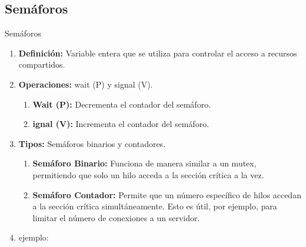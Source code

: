 \documentclass{beamer}
\begin{document}
\subsection{Semáforos}
\begin{frame}{Semáforos}

\begin{block}   
    \begin{enumerate}
        \item \textbf{Definición:} Variable entera que se utiliza para controlar el acceso a recursos compartidos. \pause
        \item \textbf{Operaciones:} wait (P) y signal (V).
        \begin{enumerate}
            \item \textbf{Wait (P):} Decrementa el contador del semáforo.
            \item \textbf{ignal (V):} Incrementa el contador del semáforo.
        \end{enumerate}\pause
        \item \textbf{Tipos:} Semáforos binarios y contadores.
        \begin{enumerate}
            \item \textbf{Semáforo Binario:} Funciona de manera similar a un mutex, permitiendo que solo un hilo acceda a la sección crítica a la vez.
            \item \textbf{Semáforo Contador:} Permite que un número específico de hilos accedan a la sección crítica simultáneamente. Esto es útil, por ejemplo, para limitar el número de conexiones a un servidor.
        \end{enumerate}
        \item ejemplo:
    \end{enumerate}
\end{block}
\end{frame}


        
\end{document}
